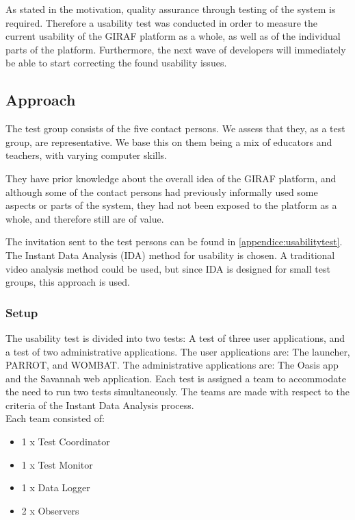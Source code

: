 
\label{common:sec:usabilitytest}
As stated in the motivation, quality assurance through testing of the system is required. Therefore a usability test was conducted in order to measure the current usability of the GIRAF platform as a whole, as well as of the individual parts of the platform. Furthermore, the next wave of developers will immediately be able to start correcting the found usability issues.

\subsection{Approach}
The test group consists of the five contact persons. We assess that they, as a test group, are representative. We base this on them being a mix of educators and teachers, with varying computer skills.

They have prior knowledge about the overall idea of the GIRAF platform, and although some of the contact persons had previously informally used some aspects or parts of the system, they had not been exposed to the platform as a whole, and therefore still are of value.

The invitation sent to the test persons can be found in \autoref{appendice:usabilitytest}.\\

The Instant Data Analysis (IDA) method for usability is chosen. A traditional video analysis method could be used, but since IDA is designed for small test groups, this approach is used. \cite{usability:ida}

\subsubsection*{Setup}
The usability test is divided into two tests: A test of three user applications, and a test of two administrative applications. 
The user applications are: The launcher, PARROT, and WOMBAT. The administrative applications are: The Oasis app and the Savannah web application.
Each test is assigned a team to accommodate the need to run two tests simultaneously.
The teams are made with respect to the criteria of the Instant Data Analysis process.\\
Each team consisted of:

\begin{itemize}
	\item 1 x Test Coordinator
	\item 1 x Test Monitor
	\item 1 x Data Logger
	\item 2 x Observers
\end{itemize}

